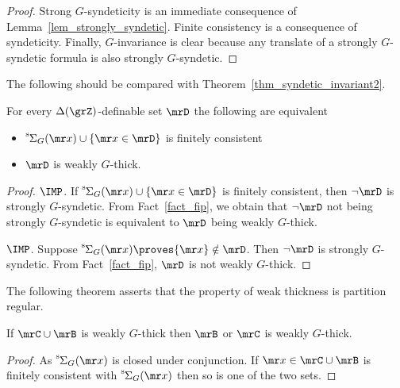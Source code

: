 \begin{proof}
  Strong $G$-syndeticity is an immediate consequence of Lemma~\ref{lem_strongly_syndetic}.
  Finite consistency is a consequence of syndeticity.
  Finally, $G$-invariance is clear because any translate of a strongly $G$-syndetic formula is also strongly $G$-syndetic.
\end{proof}

The following should be compared with Theorem~\ref{thm_syndetic_invariant2}.

\begin{corollary}\label{corol_q_w_pers}  
  For every $\Delta(\grZ)$-definable set $\mrD$ the following are equivalent
  \begin{itemize}
    \item [1.] ${\mathstrut}^{\rm s}\kern-.1ex\Sigma_G({\mr x})\cup\{{\mr x}\in\mrD\}$ is finitely consistent
    \item [2.] $\mrD$ is weakly $G$-thick.
  \end{itemize}
\end{corollary}

\begin{proof}
  $\IMP$.
  If ${\mathstrut}^{\rm s}\kern-.1ex\Sigma_G({\mr x})\cup\{{\mr x}\in\mrD\}$ is finitely consistent, then $\neg\mrD$ is strongly $G$-syndetic.
  From Fact~\ref{fact_fip}, we obtain that $\neg\mrD$ not being strongly $G$-syndetic is equivalent to $\mrD$ being weakly $G$-thick.

  $\IMP$.
  Suppose ${\mathstrut}^{\rm s}\kern-.1ex\Sigma_G({\mr x})\proves{\mr x}\notin\mrD$.
  Then $\neg\mrD$ is strongly $G$-syndetic.
  From Fact~\ref{fact_fip}, $\mrD$ is not weakly $G$-thick.
\end{proof}

The following theorem asserts that the property of weak thickness is partition regular.

\begin{theorem}\label{thm_wt_partreg}
  If $\mrC\cup\mrB$ is weakly $G$-thick then $\mrB$ or $\mrC$ is weakly $G$-thick.
\end{theorem}

\begin{proof}
  As ${\mathstrut}^{\rm s}\kern-.1ex\Sigma_G({\mr x})$ is closed under conjunction.
  If ${\mr x}\in \mrC\cup\mrB$ is finitely consistent with ${\mathstrut}^{\rm s}\kern-.1ex\Sigma_G({\mr x})$ then so is one of the two sets.
\end{proof}


